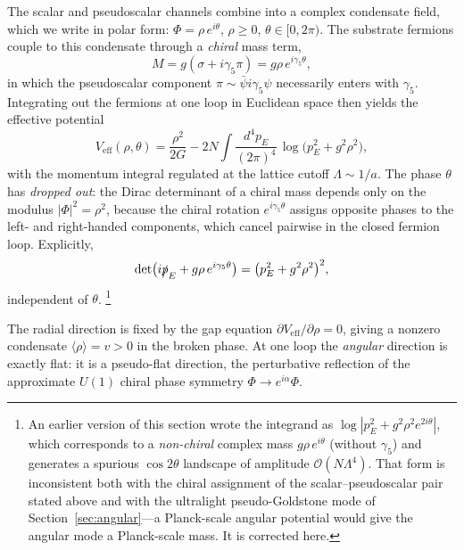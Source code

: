 \documentclass[11pt,a4paper]{article}
\begin{document}
The scalar and pseudoscalar channels combine into a complex
condensate field, which we write in polar form:
$\Phi = \rho\,e^{i\theta}$, $\rho \geq 0$, $\theta \in [0,2\pi)$.
The substrate fermions couple to this condensate through a
\emph{chiral} mass term,
\begin{equation}
M = g(\sigma + i\gamma_5\pi) = g\rho\,e^{i\gamma_5\theta},
\label{eq:chiralmass}
\end{equation}
in which the pseudoscalar component $\pi \sim \bar\psi i\gamma_5\psi$
necessarily enters with $\gamma_5$.  Integrating out the fermions at
one loop in Euclidean space then yields the effective potential
\begin{equation}
V_{\mathrm{eff}}(\rho,\theta) = \frac{\rho^2}{2G}
- 2N\int \frac{d^4p_E}{(2\pi)^4}\,
\log\bigl(p_E^2 + g^2\rho^2\bigr),
\label{eq:Veff}
\end{equation}
with the momentum integral regulated at the lattice cutoff
$\Lambda \sim 1/a$.  The phase $\theta$ has \emph{dropped out}: the
Dirac determinant of a chiral mass depends only on the modulus
$|\Phi|^2 = \rho^2$, because the chiral rotation $e^{i\gamma_5\theta}$
assigns opposite phases to the left- and right-handed components,
which cancel pairwise in the closed fermion loop.  Explicitly,
\begin{equation}
\det\bigl(i\slashed{p}_E + g\rho\,e^{i\gamma_5\theta}\bigr)
= \bigl(p_E^2 + g^2\rho^2\bigr)^2 ,
\label{eq:det-theta-indep}
\end{equation}
independent of $\theta$.%
\footnote{An earlier version of this section wrote the integrand as
$\log|p_E^2 + g^2\rho^2 e^{2i\theta}|$, which corresponds to a
\emph{non-chiral} complex mass $g\rho\,e^{i\theta}$ (without
$\gamma_5$) and generates a spurious $\cos 2\theta$ landscape of
amplitude $\mathcal{O}(N\Lambda^4)$.  That form is inconsistent both
with the chiral assignment of the scalar--pseudoscalar pair stated
above and with the ultralight pseudo-Goldstone mode of
Section~\ref{sec:angular}---a Planck-scale angular potential would
give the angular mode a Planck-scale mass.  It is corrected here.}

The radial direction is fixed by the gap equation
$\partial V_{\mathrm{eff}}/\partial\rho = 0$, giving a nonzero
condensate $\langle\rho\rangle = v > 0$ in the broken phase.  At one
loop the \emph{angular} direction is exactly flat: it is a
pseudo-flat direction, the perturbative reflection of the
approximate $U(1)$ chiral phase symmetry $\Phi \to e^{i\alpha}\Phi$.
\end{document}
